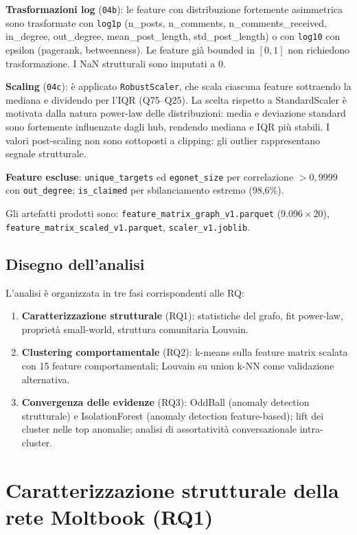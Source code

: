 \documentclass[12pt,a4paper]{report}
\newcommand{\code}[1]{\texttt{#1}}
\begin{document}
\textbf{Trasformazioni log} (\code{04b}): le feature con distribuzione fortemente asimmetrica sono trasformate con \code{log1p} (n\_posts, n\_comments, n\_comments\_received, in\_degree, out\_degree, mean\_post\_length, std\_post\_length) o con \code{log10} con epsilon (pagerank, betweenness). Le feature già bounded in $[0,1]$ non richiedono trasformazione. I NaN strutturali sono imputati a 0.

\textbf{Scaling} (\code{04c}): è applicato \code{RobustScaler}, che scala ciascuna feature sottraendo la mediana e dividendo per l'IQR (Q75--Q25). La scelta rispetto a StandardScaler è motivata dalla natura power-law delle distribuzioni: media e deviazione standard sono fortemente influenzate dagli hub, rendendo mediana e IQR più stabili. I valori post-scaling non sono sottoposti a clipping: gli outlier rappresentano segnale strutturale.

\textbf{Feature escluse}: \code{unique\_targets} ed \code{egonet\_size} per correlazione $> 0{,}9999$ con \code{out\_degree}; \code{is\_claimed} per sbilanciamento estremo (98,6\%).

Gli artefatti prodotti sono: \code{feature\_matrix\_graph\_v1.parquet} ($9.096 \times 20$), \code{feature\_matrix\_scaled\_v1.parquet}, \code{scaler\_v1.joblib}.

\section{Disegno dell'analisi}

L'analisi è organizzata in tre fasi corrispondenti alle RQ:

\begin{enumerate}
  \item \textbf{Caratterizzazione strutturale} (RQ1): statistiche del grafo, fit power-law, proprietà small-world, struttura comunitaria Louvain.
  \item \textbf{Clustering comportamentale} (RQ2): k-means sulla feature matrix scalata con 15 feature comportamentali; Louvain su union k-NN come validazione alternativa.
  \item \textbf{Convergenza delle evidenze} (RQ3): OddBall (anomaly detection strutturale) e IsolationForest (anomaly detection feature-based); lift dei cluster nelle top anomalie; analisi di assortatività conversazionale intra-cluster.
\end{enumerate}

\chapter{Caratterizzazione strutturale della rete Moltbook (RQ1)}
\end{document}
